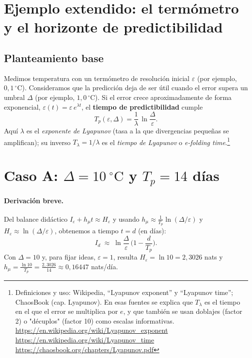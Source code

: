\documentclass[11pt,a4paper]{article}
\begin{document}
\section*{Ejemplo extendido: el termómetro y el horizonte de predictibilidad}

\subsection*{Planteamiento base}
Medimos temperatura con un termómetro de resolución inicial $\varepsilon$ (por ejemplo, $0{,}1\,^{\circ}\mathrm{C}$).
Consideramos que la predicción deja de ser útil cuando el error supera un umbral $\Delta$ (por ejemplo, $1{,}0\,^{\circ}\mathrm{C}$).
Si el error crece aproximadamente de forma exponencial, $\varepsilon(t)=\varepsilon\,e^{\lambda t}$, el \textbf{tiempo de predictibilidad} cumple
\[
T_p(\varepsilon,\Delta)=\frac{1}{\lambda}\,\ln\!\frac{\Delta}{\varepsilon}.
\]
Aquí $\lambda$ es el \emph{exponente de Lyapunov} (tasa a la que divergencias pequeñas se amplifican); su inverso $T_{\lambda}=1/\lambda$ es el \emph{tiempo de Lyapunov} o \emph{e-folding time}.\footnote{Definiciones y uso: Wikipedia, ``Lyapunov exponent'' y ``Lyapunov time''; ChaosBook (cap. Lyapunov). En esas fuentes se explica que $T_{\lambda}$ es el tiempo en el que el error se multiplica por $e$, y que también se usan doblajes (factor 2) o "décuplos" (factor 10) como escalas informativas. \url{https://en.wikipedia.org/wiki/Lyapunov_exponent} \; \url{https://en.wikipedia.org/wiki/Lyapunov_time} \; \url{https://chaosbook.org/chapters/Lyapunov.pdf}}


\section*{Caso A: $\Delta=10~^\circ\mathrm{C}$ y $T_p=14$ d\'ias}

\paragraph{Derivaci\'on breve.}
Del balance did\'actico $I_\varepsilon+h_\mu t \approx H_\varepsilon$ y usando
$h_\mu \approx \tfrac{1}{T_p}\ln(\Delta/\varepsilon)$ y $H_\varepsilon \approx \ln(\Delta/\varepsilon)$,
obtenemos a tiempo $t=d$ (en d\'ias):
\[
I_d \;\approx\; \ln\!\frac{\Delta}{\varepsilon}\,\Big(1-\frac{d}{T_p}\Big).
\]
Con $\Delta=10$ y, para fijar ideas, $\varepsilon=1$, resulta $H_\varepsilon=\ln 10=2{,}3026$ nats
y $h_\mu=\tfrac{\ln 10}{T_p}=\tfrac{2{,}3026}{14}\approx 0{,}16447$ nats/d\'ia.
\end{document}
